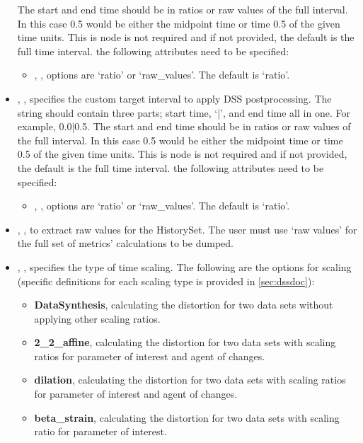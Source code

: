 \begin{itemize}
      The start and end time should be in ratios or raw values of the full interval. In this case 0.5 would be either the midpoint time or time 0.5 of the given time units. This is node is not required and if not provided, the default is the full time interval.
      the following attributes need to be specified:
      \begin{itemize}
        \item {}, , options are `ratio' or `raw\_values'. The default is `ratio'.
      \end{itemize}
    \item {}, , specifies the custom target interval to apply DSS postprocessing. The string should contain three parts; start time, `|', and end time all in one. For example, 0.0|0.5.
      The start and end time should be in ratios or raw values of the full interval. In this case 0.5 would be either the midpoint time or time 0.5 of the given time units. This is node is not required and if not provided, the default is the full time interval.
      the following attributes need to be specified:
      \begin{itemize}
        \item {}, , options are `ratio' or `raw\_values'. The default is `ratio'.
      \end{itemize}
    \item {}, , to extract raw values for the HistorySet. The user must use `raw values' for the full set of metrics’ calculations to be dumped.
    \item {}, , specifies the type of time scaling. The following are the options for scaling (specific definitions for each scaling type is provided in \ref{sec:dssdoc}):
      \begin{itemize}
        \item \textbf{DataSynthesis}, calculating the distortion for two data sets without applying other scaling ratios.
        \item \textbf{2\_2\_affine}, calculating the distortion for two data sets with scaling ratios for parameter of interest and agent of changes.
        \item \textbf{dilation}, calculating the distortion for two data sets with scaling ratios for parameter of interest and agent of changes.
        \item \textbf{beta\_strain}, calculating the distortion for two data sets with scaling ratio for parameter of interest.

\end{itemize}
\end{itemize}
